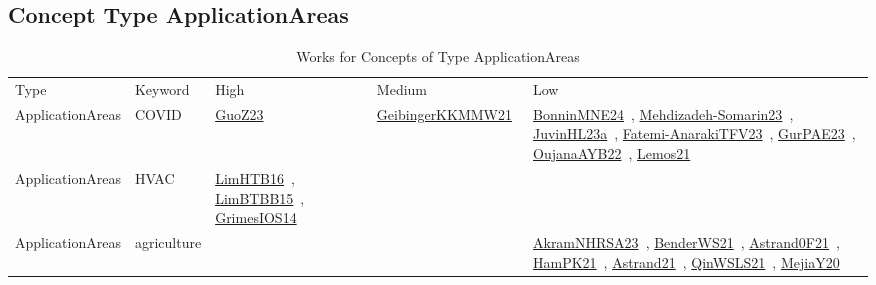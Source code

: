 \clearpage
\subsection{Concept Type ApplicationAreas}
\label{sec:ApplicationAreas}
{\scriptsize
\begin{longtable}{lp{3cm}>{\raggedright\arraybackslash}p{6cm}>{\raggedright\arraybackslash}p{6cm}>{\raggedright\arraybackslash}p{8cm}}
\rowcolor{white}\caption{Works for Concepts of Type ApplicationAreas}\\ \toprule
\rowcolor{white}Type & Keyword & High & Medium & Low\\ \midrule\endhead
\bottomrule
\endfoot
ApplicationAreas & COVID & \href{../works/GuoZ23.pdf}{GuoZ23}~\cite{GuoZ23} & \href{../works/GeibingerKKMMW21.pdf}{GeibingerKKMMW21}~\cite{GeibingerKKMMW21} & \href{../works/BonninMNE24.pdf}{BonninMNE24}~\cite{BonninMNE24}, \href{../works/Mehdizadeh-Somarin23.pdf}{Mehdizadeh-Somarin23}~\cite{Mehdizadeh-Somarin23}, \href{../works/JuvinHL23a.pdf}{JuvinHL23a}~\cite{JuvinHL23a}, \href{../works/Fatemi-AnarakiTFV23.pdf}{Fatemi-AnarakiTFV23}~\cite{Fatemi-AnarakiTFV23}, \href{../works/GurPAE23.pdf}{GurPAE23}~\cite{GurPAE23}, \href{../works/OujanaAYB22.pdf}{OujanaAYB22}~\cite{OujanaAYB22}, \href{../works/Lemos21.pdf}{Lemos21}~\cite{Lemos21}\\
ApplicationAreas & HVAC & \href{../works/LimHTB16.pdf}{LimHTB16}~\cite{LimHTB16}, \href{../works/LimBTBB15.pdf}{LimBTBB15}~\cite{LimBTBB15}, \href{../works/GrimesIOS14.pdf}{GrimesIOS14}~\cite{GrimesIOS14} &  & \\
ApplicationAreas & agriculture &  &  & \href{../works/AkramNHRSA23.pdf}{AkramNHRSA23}~\cite{AkramNHRSA23}, \href{../works/BenderWS21.pdf}{BenderWS21}~\cite{BenderWS21}, \href{../works/Astrand0F21.pdf}{Astrand0F21}~\cite{Astrand0F21}, \href{../works/HamPK21.pdf}{HamPK21}~\cite{HamPK21}, \href{../works/Astrand21.pdf}{Astrand21}~\cite{Astrand21}, \href{../works/QinWSLS21.pdf}{QinWSLS21}~\cite{QinWSLS21}, \href{../works/MejiaY20.pdf}{MejiaY20}~\cite{MejiaY20}\\

\end{longtable}}
